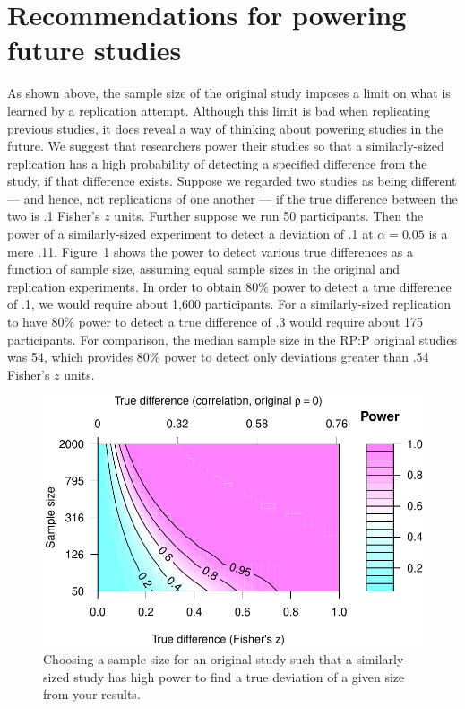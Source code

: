 \documentclass[doc,a4paper,floatsintext,draftfirst]{apa6}
\makeatletter
\def\maxwidth{ %
  \ifdim\Gin@nat@width>\linewidth
    \linewidth
  \else
    \Gin@nat@width
  \fi
}
\makeatother
\begin{document}
\nocite{Simonsohn:2015}

\section{Recommendations for powering future studies}

As shown above, the sample size of the original study imposes a limit on what is learned by a replication attempt. Although this limit is bad when replicating previous studies, it does reveal a way of thinking about powering studies in the future. We suggest that researchers power their studies so that a similarly-sized replication has a high probability of detecting a specified difference from the study, if that difference exists. Suppose we regarded two studies as being different --- and hence, not replications of one another --- if the true difference between the two is .1 Fisher's $z$ units. Further suppose we run 50 participants. Then the power of a similarly-sized experiment to detect a deviation of .1 at $\alpha=0.05$ is a mere .11. Figure~\ref{fig:reppower3} shows the power to detect various true differences as a function of sample size, assuming equal sample sizes in the original and replication experiments. In order to obtain 80\% power to detect a true difference of .1, we would require about 1,600 participants. For a similarly-sized replication to have 80\% power to detect a true difference of .3 would require about 175 participants. For comparison, the median sample size in the RP:P original studies was 54, which provides 80\% power to detect only deviations greater than .54 Fisher's $z$ units.


\begin{figure}
\includegraphics[width=\maxwidth]{figure/reppower3-1} \caption[Choosing a sample size for an original study such that a similarly-sized study has high power to find a true deviation of a given size from your results]{Choosing a sample size for an original study such that a similarly-sized study has high power to find a true deviation of a given size from your results.}\label{fig:reppower3}
\end{figure}
\end{document}
